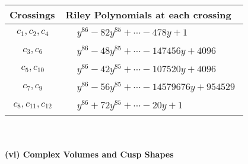 \documentclass[1p]{elsarticle_modified}
\theoremstyle{definition}
\begin{document}
\begin{tabular}{m{50pt}|m{274pt}}
Crossings & \hspace{64pt}Riley Polynomials at each crossing \\
\hline $$\begin{aligned}c_{1},c_{2},c_{4}\end{aligned}$$&$\begin{aligned}
&y^{86}-82 y^{85}+\cdots-478 y+1
\end{aligned}$\\
\hline $$\begin{aligned}c_{3},c_{6}\end{aligned}$$&$\begin{aligned}
&y^{86}-48 y^{85}+\cdots-147456 y+4096
\end{aligned}$\\
\hline $$\begin{aligned}c_{5},c_{10}\end{aligned}$$&$\begin{aligned}
&y^{86}-42 y^{85}+\cdots-107520 y+4096
\end{aligned}$\\
\hline $$\begin{aligned}c_{7},c_{9}\end{aligned}$$&$\begin{aligned}
&y^{86}-56 y^{85}+\cdots-14579676 y+954529
\end{aligned}$\\
\hline $$\begin{aligned}c_{8},c_{11},c_{12}\end{aligned}$$&$\begin{aligned}
&y^{86}+72 y^{85}+\cdots-20 y+1
\end{aligned}$\\
\hline
\end{tabular}\\~\\
\newpage\flushleft \textbf{(vi) Complex Volumes and Cusp Shapes}
\end{document}
